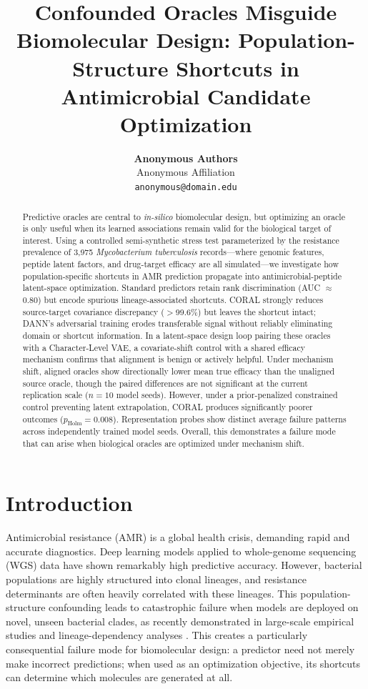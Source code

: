 \documentclass{article}
\title{Confounded Oracles Misguide Biomolecular Design: Population-Structure Shortcuts in Antimicrobial Candidate Optimization}
\author{
  \textbf{Anonymous Authors} \\
  Anonymous Affiliation \\
  \texttt{anonymous@domain.edu}
}
\begin{document}
\maketitle

\begin{abstract}
Predictive oracles are central to \textit{in-silico} biomolecular design, but optimizing an oracle is only useful when its learned associations remain valid for the biological target of interest. Using a controlled semi-synthetic stress test parameterized by the resistance prevalence of 3,975 \textit{Mycobacterium tuberculosis} records---where genomic features, peptide latent factors, and drug-target efficacy are all simulated---we investigate how population-specific shortcuts in AMR prediction propagate into antimicrobial-peptide latent-space optimization. Standard predictors retain rank discrimination (AUC $\approx$ 0.80) but encode spurious lineage-associated shortcuts. CORAL strongly reduces source-target covariance discrepancy ($>$99.6\%) but leaves the shortcut intact; DANN's adversarial training erodes transferable signal without reliably eliminating domain or shortcut information. In a latent-space design loop pairing these oracles with a Character-Level VAE, a covariate-shift control with a shared efficacy mechanism confirms that alignment is benign or actively helpful. Under mechanism shift, aligned oracles show directionally lower mean true efficacy than the unaligned source oracle, though the paired differences are not significant at the current replication scale ($n{=}10$ model seeds). However, under a prior-penalized constrained control preventing latent extrapolation, CORAL produces significantly poorer outcomes ($p_{\text{Holm}} = 0.008$). Representation probes show distinct average failure patterns across independently trained model seeds. Overall, this demonstrates a failure mode that can arise when biological oracles are optimized under mechanism shift.
\end{abstract}

\section{Introduction}
Antimicrobial resistance (AMR) is a global health crisis, demanding rapid and accurate diagnostics. Deep learning models applied to whole-genome sequencing (WGS) data have shown remarkably high predictive accuracy. However, bacterial populations are highly structured into clonal lineages, and resistance determinants are often heavily correlated with these lineages. This population-structure confounding leads to catastrophic failure when models are deployed on novel, unseen bacterial clades, as recently demonstrated in large-scale empirical studies \cite{yu2025population} and lineage-dependency analyses \cite{billows2023mtb}. This creates a particularly consequential failure mode for biomolecular design: a predictor need not merely make incorrect predictions; when used as an optimization objective, its shortcuts can determine which molecules are generated at all.
\end{document}
